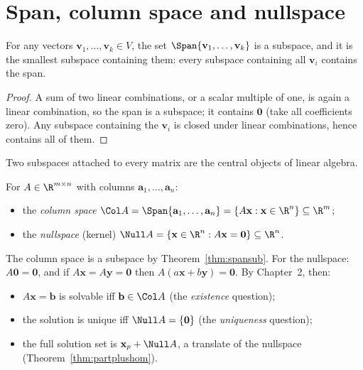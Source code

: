 \section{Span, column space and nullspace}

\begin{theorem}\label{thm:spansub}
For any vectors $\mathbf{v}_1,\dots,\mathbf{v}_k\in V$, the set $\Span\{\mathbf{v}_1,\dots,\mathbf{v}_k\}$ is a subspace, and it is the smallest subspace containing them: every subspace containing all $\mathbf{v}_i$ contains the span.
\end{theorem}

\begin{proof}
A sum of two linear combinations, or a scalar multiple of one, is again a linear combination, so the span is a subspace; it contains $\mathbf{0}$ (take all coefficients zero). Any subspace containing the $\mathbf{v}_i$ is closed under linear combinations, hence contains all of them.
\end{proof}

Two subspaces attached to every matrix are the central objects of linear algebra.

\begin{definition}
For $A\in\R^{m\times n}$ with columns $\mathbf{a}_1,\dots,\mathbf{a}_n$:
\begin{itemize}
  \item the \emph{column space} $\Col A=\Span\{\mathbf{a}_1,\dots,\mathbf{a}_n\}=\{A\mathbf{x}:\mathbf{x}\in\R^n\}\subseteq\R^m$;
  \item the \emph{nullspace} (kernel) $\Null A=\{\mathbf{x}\in\R^n:A\mathbf{x}=\mathbf{0}\}\subseteq\R^n$.
\end{itemize}
\end{definition}

The column space is a subspace by Theorem~\ref{thm:spansub}. For the nullspace: $A\mathbf{0}=\mathbf{0}$, and if $A\mathbf{x}=A\mathbf{y}=\mathbf{0}$ then $A(a\mathbf{x}+b\mathbf{y})=\mathbf{0}$. By Chapter~2, then:

\begin{itemize}
  \item $A\mathbf{x}=\mathbf{b}$ is solvable iff $\mathbf{b}\in\Col A$ (the \emph{existence} question);
  \item the solution is unique iff $\Null A=\{\mathbf{0}\}$ (the \emph{uniqueness} question);
  \item the full solution set is $\mathbf{x}_p+\Null A$, a translate of the nullspace (Theorem~\ref{thm:partplushom}).
\end{itemize}

